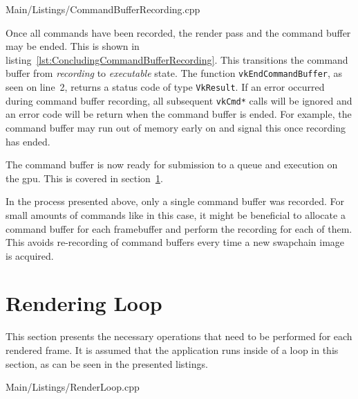       
      {Main/Listings/CommandBufferRecording.cpp}

      Once all commands have been recorded, the render pass and the command buffer may be ended.
      This is shown in listing~\ref{lst:ConcludingCommandBufferRecording}.
      This transitions the command buffer from \textit{recording} to \textit{executable} state.
      The function \lstinline{vkEndCommandBuffer}, as seen on line~2, returns a status code of type \lstinline{VkResult}.
      If an error occurred during command buffer recording, all subsequent \lstinline{vkCmd*} calls will be ignored and an error code will be return when the command buffer is ended.
      For example, the command buffer may run out of memory early on and signal this once recording has ended.

      The command buffer is now ready for submission to a queue and execution on the \gls{gpu}.
      This is covered in section~\ref{sec:RenderLoop}.

      In the process presented above, only a single command buffer was recorded.
      For small amounts of commands like in this case, it might be beneficial to allocate a command buffer for each framebuffer and perform the recording for each of them.
      This avoids re-recording of command buffers every time a new swapchain image is acquired.


  \section{Rendering Loop}
  \label{sec:RenderLoop}
    This section presents the necessary operations that need to be performed for each rendered frame.
    It is assumed that the application runs inside of a loop in this section, as can be seen in the presented listings.


    
    {Main/Listings/RenderLoop.cpp}

